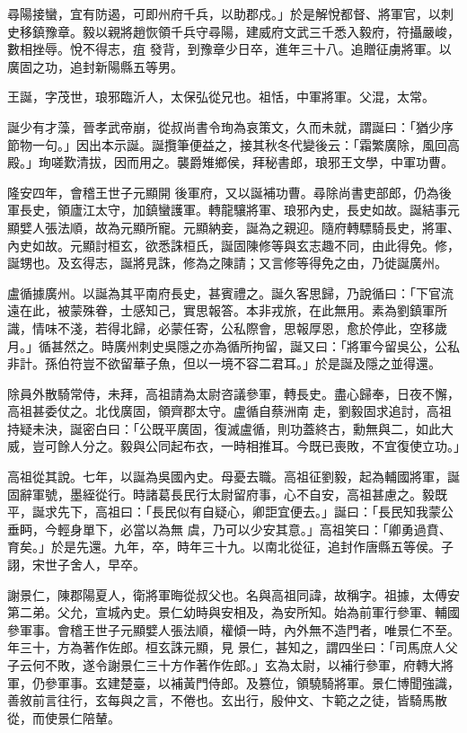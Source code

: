 \begin{pinyinscope}
 尋陽接蠻，宜有防遏，可即州府千兵，以助郡戍。」於是解悅都督、將軍官，以刺史移鎮豫章。毅以親將趙恢領千兵守尋陽，建威府文武三千悉入毅府，符攝嚴峻，數相挫辱。悅不得志，疽
 發背，到豫章少日卒，進年三十八。追贈征虜將軍。以廣固之功，追封新陽縣五等男。



 王誕，字茂世，琅邪臨沂人，太保弘從兄也。祖恬，中軍將軍。父混，太常。



 誕少有才藻，晉孝武帝崩，從叔尚書令珣為哀策文，久而未就，謂誕曰：「猶少序節物一句。」因出本示誕。誕攬筆便益之，接其秋冬代變後云：「霜繁廣除，風回高殿。」珣嗟歎清拔，因而用之。襲爵雉鄉侯，拜秘書郎，琅邪王文學，中軍功曹。



 隆安四年，會稽王世子元顯開
 後軍府，又以誕補功曹。尋除尚書吏部郎，仍為後軍長史，領廬江太守，加鎮蠻護軍。轉龍驤將軍、琅邪內史，長史如故。誕結事元顯嬖人張法順，故為元顯所寵。元顯納妾，誕為之親迎。隨府轉驃騎長史，將軍、內史如故。元顯討桓玄，欲悉誅桓氏，誕固陳修等與玄志趣不同，由此得免。修，誕甥也。及玄得志，誕將見誅，修為之陳請；又言修等得免之由，乃徙誕廣州。



 盧循據廣州。以誕為其平南府長史，甚賓禮之。誕久客思歸，乃說循曰：「下官流
 遠在此，被蒙殊眷，士感知己，實思報答。本非戎旅，在此無用。素為劉鎮軍所識，情味不淺，若得北歸，必蒙任寄，公私際會，思報厚恩，愈於停此，空移歲月。」循甚然之。時廣州刺史吳隱之亦為循所拘留，誕又曰：「將軍今留吳公，公私非計。孫伯符豈不欲留華子魚，但以一境不容二君耳。」於是誕及隱之並得還。



 除員外散騎常侍，未拜，高祖請為太尉咨議參軍，轉長史。盡心歸奉，日夜不懈，高祖甚委仗之。北伐廣固，領齊郡太守。盧循自蔡洲南
 走，劉毅固求追討，高祖持疑未決，誕密白曰：「公既平廣固，復滅盧循，則功蓋終古，勳無與二，如此大威，豈可餘人分之。毅與公同起布衣，一時相推耳。今既已喪敗，不宜復使立功。」



 高祖從其說。七年，以誕為吳國內史。母憂去職。高祖征劉毅，起為輔國將軍，誕固辭軍號，墨絰從行。時諸葛長民行太尉留府事，心不自安，高祖甚慮之。毅既平，誕求先下，高祖曰：「長民似有自疑心，卿詎宜便去。」誕曰：「長民知我蒙公垂眄，今輕身單下，必當以為無
 虞，乃可以少安其意。」高祖笑曰：「卿勇過賁、育矣。」於是先還。九年，卒，時年三十九。以南北從征，追封作唐縣五等侯。子詡，宋世子舍人，早卒。



 謝景仁，陳郡陽夏人，衛將軍晦從叔父也。名與高祖同諱，故稱字。祖據，太傅安第二弟。父允，宣城內史。景仁幼時與安相及，為安所知。始為前軍行參軍、輔國參軍事。會稽王世子元顯嬖人張法順，權傾一時，內外無不造門者，唯景仁不至。年三十，方為著作佐郎。桓玄誅元顯，見
 景仁，甚知之，謂四坐曰：「司馬庶人父子云何不敗，遂令謝景仁三十方作著作佐郎。」玄為太尉，以補行參軍，府轉大將軍，仍參軍事。玄建楚臺，以補黃門侍郎。及篡位，領驍騎將軍。景仁博聞強識，善敘前言往行，玄每與之言，不倦也。玄出行，殷仲文、卞範之之徒，皆騎馬散從，而使景仁陪輦。




\end{pinyinscope}
